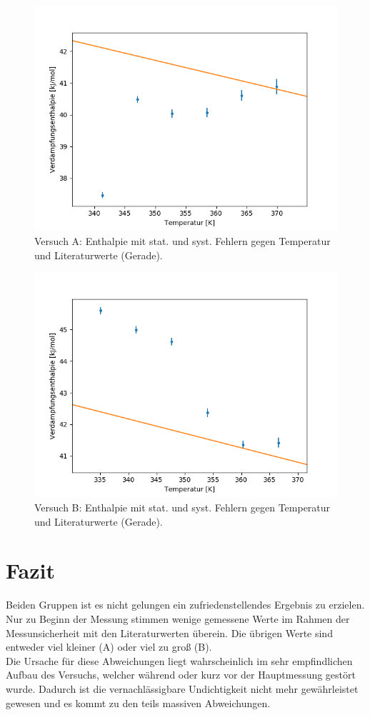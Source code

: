 \documentclass[12pt,a4paper]{article}
\begin{document}
\begin{figure}
\begin{center}
\includegraphics[width=0.8\linewidth]{Bilder/Enthalpie_gegen_TempA}
\caption{Versuch A: Enthalpie mit stat. und syst. Fehlern gegen Temperatur und Literaturwerte (Gerade).}
\label{fig:EntTempA}
\end{center}
\end{figure}
\begin{figure}[H]
\begin{center}
\includegraphics[width=0.8\linewidth]{Bilder/Enthalpie_gegen_TempB}
\caption{Versuch B: Enthalpie mit stat. und syst. Fehlern gegen Temperatur und Literaturwerte (Gerade).}
\label{fig:EntTempB}
\end{center}
\end{figure}






\section{Fazit}
Beiden Gruppen ist es nicht gelungen ein zufriedenstellendes Ergebnis zu erzielen. Nur zu Beginn der Messung stimmen wenige gemessene Werte im Rahmen der Messunsicherheit mit den Literaturwerten überein. Die übrigen Werte sind entweder viel kleiner (A) oder viel zu groß (B).\\
Die Ursache für diese Abweichungen liegt wahrscheinlich im sehr empfindlichen Aufbau des Versuchs, welcher  während oder kurz vor der Hauptmessung gestört wurde. Dadurch ist die vernachlässigbare Undichtigkeit nicht mehr gewährleistet gewesen und es kommt zu den teils massiven Abweichungen.
\end{document}
